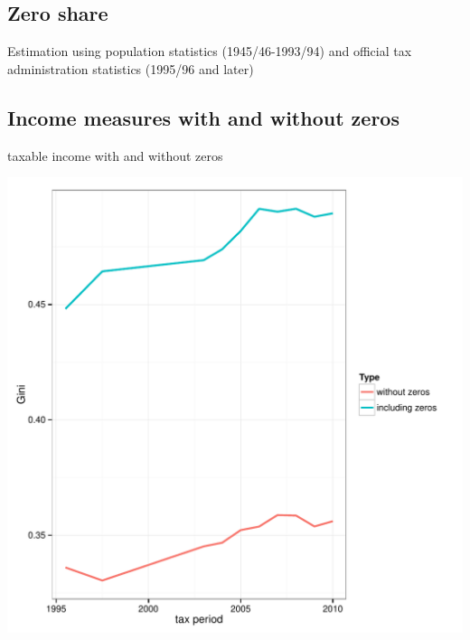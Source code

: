 \documentclass[twoside]{article}\usepackage[]{graphicx}\usepackage[]{color}
\makeatletter
\def\maxwidth{ %
  \ifdim\Gin@nat@width>\linewidth
    \linewidth
  \else
    \Gin@nat@width
  \fi
}
\newenvironment{kframe}{%
 \def\at@end@of@kframe{}%
 \ifinner\ifhmode%
  \def\at@end@of@kframe{\end{minipage}}%
  \begin{minipage}{\columnwidth}%
 \fi\fi%
 \def\FrameCommand##1{\hskip\@totalleftmargin \hskip-\fboxsep
 \colorbox{shadecolor}{##1}\hskip-\fboxsep
     \hskip-\linewidth \hskip-\@totalleftmargin \hskip\columnwidth}%
 \MakeFramed {\advance\hsize-\width
   \@totalleftmargin\z@ \linewidth\hsize
   \@setminipage}}%
 {\par\unskip\endMakeFramed%
 \at@end@of@kframe}
\newenvironment{knitrout}{}{} %
\makeatother
\begin{document}
\begin{multicols}{2}
\begin{knitrout}
\end{knitrout}


\subsection{Zero share}

Estimation using population statistics (1945/46-1993/94) and official tax administration statistics (1995/96 and later) 


\subsection{Income measures with and without zeros}

taxable income with and without zeros

\begin{knitrout}
\color{fgcolor}
\includegraphics[width=\maxwidth]{figure/with_without_zeros1} 
\begin{kframe}


\end{kframe}
\end{knitrout}
\end{multicols}
\end{document}
